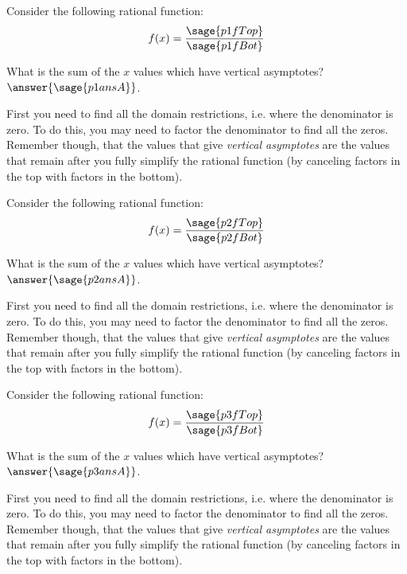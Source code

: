 \documentclass{ximera}
\begin{document}
\begin{problem}
    Consider the following rational function:
    \[
        f(x) = \frac{\sage{p1fTop}}{\sage{p1fBot}}
    \]
    
    What is the sum of the $x$ values which have vertical asymptotes? $\answer{\sage{p1ansA}}$.
    \begin{feedback}
        First you need to find all the domain restrictions, i.e. where the denominator is zero. To do this, you may need to factor the denominator to find all the zeros. Remember though, that the values that give \textit{vertical asymptotes} are the values that remain after you fully simplify the rational function (by canceling factors in the top with factors in the bottom).
    \end{feedback}
\end{problem}




\begin{problem}
    Consider the following rational function:
    \[
        f(x) = \frac{\sage{p2fTop}}{\sage{p2fBot}}
    \]
    
    What is the sum of the $x$ values which have vertical asymptotes? $\answer{\sage{p2ansA}}$.
    \begin{feedback}
        First you need to find all the domain restrictions, i.e. where the denominator is zero. To do this, you may need to factor the denominator to find all the zeros. Remember though, that the values that give \textit{vertical asymptotes} are the values that remain after you fully simplify the rational function (by canceling factors in the top with factors in the bottom).
    \end{feedback}
\end{problem}




\begin{problem}
    Consider the following rational function:
    \[
        f(x) = \frac{\sage{p3fTop}}{\sage{p3fBot}}
    \]
    
    What is the sum of the $x$ values which have vertical asymptotes? $\answer{\sage{p3ansA}}$.
    \begin{feedback}
        First you need to find all the domain restrictions, i.e. where the denominator is zero. To do this, you may need to factor the denominator to find all the zeros. Remember though, that the values that give \textit{vertical asymptotes} are the values that remain after you fully simplify the rational function (by canceling factors in the top with factors in the bottom).
    \end{feedback}
\end{problem}
\end{document}
